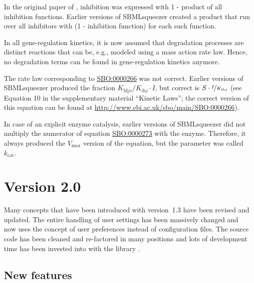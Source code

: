 \begin{dinglist}{54}
\item In the original paper of \citet{Hinze2007}, inhibition was expressed with 1 -
product of all inhibition functions. Earlier versions of SBMLsqueezer created a
product that run over all inhibitors with (1 - inhibition function) for each
such function.

\item In all gene-regulation kinetics, it is now assumed that degradation processes
are distinct reactions that can be, e.g., modeled using a mass action rate law.
Hence, no degradation terms can be found in gene-regulation kinetics anymore.

\item The rate law corresponding to
\href{identifiers.org/biomodels.sbo/SBO:0000266}{SBO:0000266} was not correct.
Earlier versions of SBMLsqueezer produced the fraction $K_{\mathrm{M}js}/K_{\mathrm{ib}j}\cdot I$, but
correct is $S\cdot\nicefrac{I}{K_{\mathrm{ib}j}}$ (see Equation 10 in the supplementary material ``Kinetic
Laws''; the correct version of this equation can be found at
\url{http://www.ebi.ac.uk/sbo/main/SBO:0000266}).

\item In case of an explicit enzyme catalysis, earlier versions of SBMLsqueezer did not
multiply the numerator of equation
\href{identifiers.org/biomodels.sbo/SBO:0000273}{SBO:0000273} with the enzyme.
Therefore, it always produced the $V_\mathrm{max}$ version of the equation, but the parameter
was called $k_\mathrm{cat}$.
\end{dinglist}

\section{Version 2.0}

Many concepts that have been introduced with version~1.3 have been revised and
updated. The entire handling of user settings has been massively changed and now
uses the concept of user preferences instead of configuration files. The source
code has been cleaned and re-factored in many positions and lots of development
time has been invested into with the library \JSBML.

\subsection{New features}

